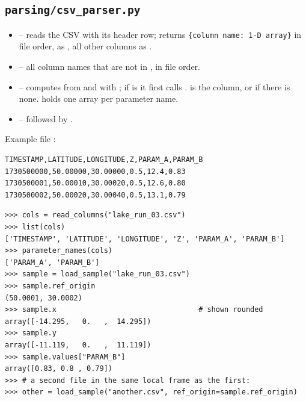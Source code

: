 \documentclass{article}
\begin{document}
\subsection{\texttt{parsing/csv\_parser.py}}

\begin{itemize}
\item {} -- reads the CSV with
      its header row; returns \verb|{column name: 1-D array}| in file order,
       as , all other columns as
      .
\item {} -- all column names that
      are not in , in file order.
\item {} -- computes
       from  and  with
      ; if  is  it first
      calls .  is the 
      column, or  if there is none.  holds one array
      per parameter name.
\item {} --
       followed by .
\end{itemize}

Example file :

\begin{lstlisting}
TIMESTAMP,LATITUDE,LONGITUDE,Z,PARAM_A,PARAM_B
1730500000,50.00000,30.00000,0.5,12.4,0.83
1730500001,50.00010,30.00020,0.5,12.6,0.80
1730500002,50.00020,30.00040,0.5,13.1,0.79
\end{lstlisting}

\begin{lstlisting}
>>> cols = read_columns("lake_run_03.csv")
>>> list(cols)
['TIMESTAMP', 'LATITUDE', 'LONGITUDE', 'Z', 'PARAM_A', 'PARAM_B']
>>> parameter_names(cols)
['PARAM_A', 'PARAM_B']
>>> sample = load_sample("lake_run_03.csv")
>>> sample.ref_origin
(50.0001, 30.0002)
>>> sample.x                                 # shown rounded
array([-14.295,   0.   ,  14.295])
>>> sample.y
array([-11.119,   0.   ,  11.119])
>>> sample.values["PARAM_B"]
array([0.83, 0.8 , 0.79])
>>> # a second file in the same local frame as the first:
>>> other = load_sample("another.csv", ref_origin=sample.ref_origin)
\end{lstlisting}
\end{document}
